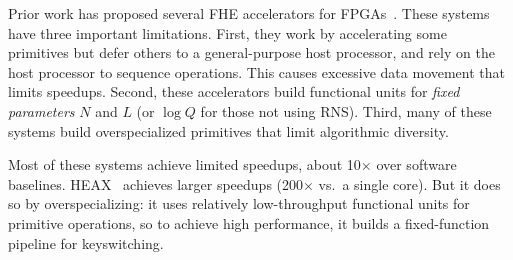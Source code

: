 Prior work has proposed several FHE accelerators for
FPGAs~\cite{cousins:hpec14:fpga-he,cousins:tetc17:fpga-he,doroz:tc15:accelerating-fhe,roy:hpca19:fpga-he,migliore:tecs17:he-karatsuba,riazi:asplos20:heax,turan:tc20:heaws,mert:tvlsi20:bfv-accel}.
These systems have three important limitations. First, they work by
accelerating some primitives but defer others to a general-purpose host
processor, and rely on the host processor to sequence operations. This causes
excessive data movement that limits speedups. Second, these accelerators build
functional units for \emph{fixed parameters} $N$ and $L$ (or $\log Q$ for those
not using RNS). Third, many of these systems build overspecialized primitives
that limit algorithmic diversity.

Most of these systems achieve limited speedups, about 10$\times$ over software
baselines. HEAX~\cite{riazi:asplos20:heax} achieves larger speedups
(200$\times$ vs.\ a single core). But it does so by overspecializing: it uses
relatively low-throughput functional units for primitive operations, so to
achieve high performance, it builds a fixed-function pipeline for keyswitching.
